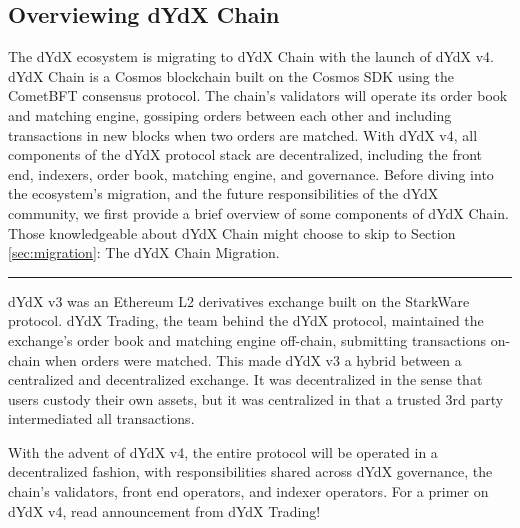 \begin{fullwidth}
    \section{Overviewing dYdX Chain} \label{sec:introduction}

    \begin{adjustwidth}{2cm}{2cm}
        \justify
        The dYdX ecosystem is migrating to dYdX Chain with the launch of dYdX v4. dYdX Chain is a Cosmos blockchain built on the Cosmos SDK using the CometBFT consensus protocol. The chain's validators will operate its order book and matching engine, gossiping orders between each other and including transactions in new blocks when two orders are matched. With dYdX v4, all components of the dYdX protocol stack are decentralized, including the front end, indexers, order book, matching engine, and governance. Before diving into the ecosystem's migration, and the future responsibilities of the dYdX community, we first provide a brief overview of some components of dYdX Chain. Those knowledgeable about dYdX Chain might choose to skip to Section \ref{sec:migration}: The dYdX Chain Migration.
    \end{adjustwidth}
    
    \textcolor{gray}{\rule{\linewidth}{0.1mm}}
    
\end{fullwidth}

    dYdX v3 was an Ethereum L2 derivatives exchange built on the StarkWare protocol. dYdX Trading, the team behind the dYdX protocol, maintained the exchange's order book and matching engine off-chain, submitting transactions on-chain when orders were matched. This made dYdX v3 a hybrid between a centralized and decentralized exchange. It was decentralized in the sense that users custody their own assets, but it was centralized in that a trusted 3rd party intermediated all transactions.
    
    With the advent of dYdX v4, the entire protocol will be operated in a decentralized fashion, with responsibilities shared across dYdX governance, the chain's validators, front end operators, and indexer operators. For a primer on dYdX v4, read  announcement from dYdX Trading!

